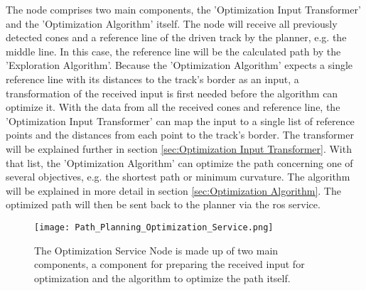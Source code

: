 The node comprises two main components, the 'Optimization Input Transformer' and the 'Optimization Algorithm' itself. The node will receive all previously detected cones and a reference line of the driven track by the planner, e.g. the middle line. In this case, the reference line will be the calculated path by the 'Exploration Algorithm'. Because the 'Optimization Algorithm' expects a single reference line with its distances to the track's border as an input, a transformation of the received input is first needed before the algorithm can optimize it. With the data from all the received cones and reference line, the 'Optimization Input Transformer' can map the input to a single list of reference points and the distances from each point to the track's border. The transformer will be explained further in section \ref{sec:Optimization Input Transformer}. With that list, the 'Optimization Algorithm' can optimize the path concerning one of several objectives, e.g. the shortest path or minimum curvature. The algorithm will be explained in more detail in section \ref{sec:Optimization Algorithm}. The optimized path will then be sent back to the planner via the  \acrshort{ros} service.
\begin{figure}[H]
    \centering
    \texttt{[image: Path\_Planning\_Optimization\_Service.png]}
    \caption{The Optimization Service Node is made up of two main components, a component for preparing the received input for optimization and the algorithm to optimize the path itself.}
    \label{fig:Path Planning Optimization Service Node}
\end{figure}

